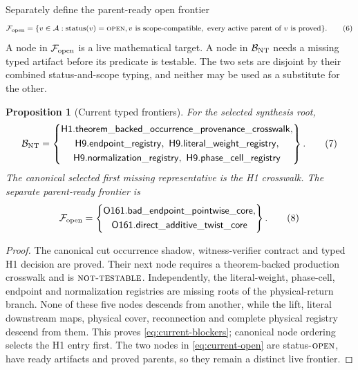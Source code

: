 \documentclass[11pt]{article}
\newtheorem{proposition}[theorem]{Proposition}
\theoremstyle{definition}
\theoremstyle{remark}
\newcommand{\NT}{\textnormal{\textsc{not-testable}}}
\newcommand{\OPEN}{\textnormal{\textsc{open}}}
\begin{document}
Separately define the parent-ready open frontier
\[
 \mathcal F_{\rm open}
 =
 \{v\in\mathcal A:
   \operatorname{status}(v)=\OPEN,
   v\text{ is scope-compatible},\
   \text{every active parent of }v\text{ is proved}\}.
\tag{6}\label{eq:open-frontier}
\]
A node in \(\mathcal F_{\rm open}\) is a live mathematical target.
A node in \(\mathcal B_{\rm NT}\) needs a missing typed artifact before
its predicate is testable.  The two sets are disjoint by their
combined status-and-scope typing, and neither may be used as a
substitute for the other.

\begin{proposition}[Current typed frontiers]
\label{prop:blocker}
For the selected synthesis root,
\[
 \mathcal B_{\rm NT}
 =
 \left\{
 \begin{gathered}
 \mathsf{H1.theorem\_backed\_occurrence\_provenance\_crosswalk},\\
 \mathsf{H9.endpoint\_registry},\
 \mathsf{H9.literal\_weight\_registry},\\
 \mathsf{H9.normalization\_registry},\
 \mathsf{H9.phase\_cell\_registry}
 \end{gathered}
 \right\}.
\tag{7}\label{eq:current-blockers}
\]
The canonical selected first missing representative is the H1
crosswalk.  The separate parent-ready frontier is
\[
 \mathcal F_{\rm open}
 =
 \left\{
 \begin{gathered}
 \mathsf{O161.bad\_endpoint\_pointwise\_core},\\
 \mathsf{O161.direct\_additive\_twist\_core}
 \end{gathered}
 \right\}.
\tag{8}\label{eq:current-open}
\]
\end{proposition}

\begin{proof}
The canonical cut occurrence shadow, witness-verifier contract and
typed H1 decision are proved.  Their next node requires a
theorem-backed production crosswalk and is \(\NT\).  Independently,
the literal-weight, phase-cell, endpoint and normalization registries
are missing roots of the physical-return branch.  None of these five
nodes descends from another, while the lift, literal downstream maps,
physical cover, reconnection and complete physical registry descend
from them.  This proves \cref{eq:current-blockers}; canonical node
ordering selects the H1 entry first.  The two nodes in
\cref{eq:current-open} are status-\(\OPEN\), have ready artifacts and
proved parents, so they remain a distinct live frontier.
\end{proof}
\end{document}
